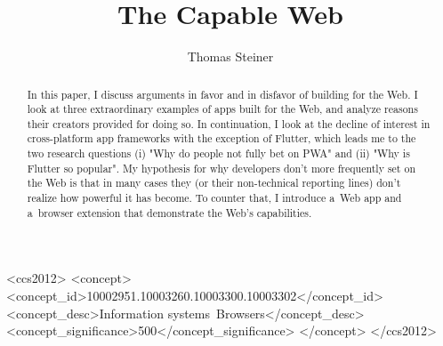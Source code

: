 \documentclass[sigconf]{acmart}
\begin{document}
\title{The Capable Web}

\author{Thomas Steiner}


\begin{abstract}
  In this paper, I discuss arguments in favor and in disfavor of building for the Web. I look at three extraordinary examples of apps built for the Web, and analyze reasons their creators provided for doing so. In continuation, I look at the decline of interest in cross-platform app frameworks with the exception of Flutter, which leads me to the two research questions (i) "Why do people not fully bet on PWA" and (ii) "Why is Flutter so popular". My hypothesis for why developers don't more frequently set on the Web is that in many cases they (or their non-technical reporting lines) don't realize how powerful it has become. To counter that, I introduce a~Web app and a~browser extension that demonstrate the Web's capabilities.
\end{abstract}

\begin{CCSXML}
<ccs2012>
<concept>
<concept_id>10002951.10003260.10003300.10003302</concept_id>
<concept_desc>Information systems~Browsers</concept_desc>
<concept_significance>500</concept_significance>
</concept>
</ccs2012>
\end{CCSXML}

\end{document}

